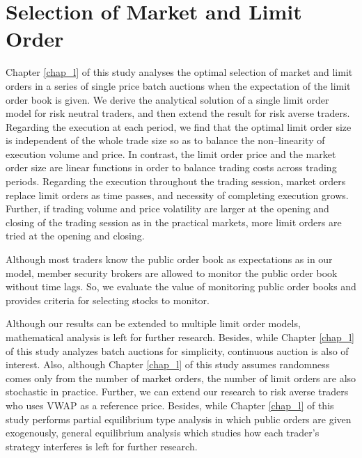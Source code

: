 \section{Selection of Market and Limit Order}\label{sec_c3}
Chapter \ref{chap_l} of this study analyses the optimal selection of market and limit orders in a series of single price batch auctions when the expectation of the limit order book is given.  We derive the analytical solution of a single limit order model for risk neutral traders, and then extend the result for risk averse traders.  Regarding the execution at each period, we find that the optimal limit order size is independent of the whole trade size so as to balance the non--linearity of execution volume and price.  In contrast, the limit order price and the market order size are linear functions in order to balance trading costs across trading periods.  Regarding the execution throughout the trading session, market orders replace limit orders as time passes, and necessity of completing execution grows.  Further, if trading volume and price volatility are larger at the opening and closing of the trading session as in the practical markets, more limit orders are tried at the opening and closing.

Although most traders know the public order book as expectations as in our model, member security brokers are allowed to monitor the public order book without time lags.  So, we evaluate the value of monitoring public order books and provides criteria for selecting stocks to monitor.

Although our results can be extended to multiple limit order models,  mathematical analysis is left for further research.  Besides, while Chapter \ref{chap_l} of this study analyzes batch auctions for simplicity, continuous auction is also of interest.  Also, although Chapter \ref{chap_l} of this study assumes randomness comes only from the number of market orders, the number of limit orders are also stochastic in practice.  Further, we can extend our research to risk averse traders who uses VWAP as a reference price.  Besides, while Chapter \ref{chap_l} of this study performs partial equilibrium type analysis in which public orders are given exogenously, general equilibrium analysis which studies how each trader's strategy interferes is left for further research.

